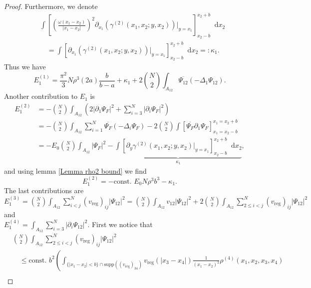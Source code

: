\documentclass[a4paper,11pt]{article}
\newcommand{\supp}{\text{supp}}
\newcommand{\abs}[1]{\left\lvert #1 \right\rvert}
\newcommand*\diff{\mathop{}\!\mathrm{d}}
\numberwithin{equation}{section}
\begin{document}
\begin{proof}
		Furthermore, we denote \begin{equation}\label{EqGammaDeriv2.}
		\begin{aligned}
		&\int\left[\left(\frac{\omega(x_1-x_2)}{\abs{x_1-x_2}}\right)^2\partial_{x_1}\left(\gamma^{(2)}(x_1,x_2;y,x_2)\right)\bigg\vert_{y=x_1}\right]_{x_2-b}^{x_2+b}\diff x_2\\
		&\quad=\int\left[\partial_{x_1}\left(\gamma^{(2)}(x_1,x_2;y,x_2)\right)\bigg\vert_{y=x_1}\right]_{x_2-b}^{x_2+b}\diff x_2=:\kappa_1.
		\end{aligned}
		\end{equation}
		Thus we have \begin{equation}
		E_1^{(1)}=\frac{\pi^2}{3}N\rho^3 (2a)\frac{b}{b-a}+\kappa_1+2\binom{N}{2}\int_{A_{12}}\overline{\Psi_{12}}(-\Delta_1\Psi_{12}).
		\end{equation}
		Another contribution to $ E_1 $ is \begin{equation}
		\begin{aligned}
		E_1^{(2)}&=-\binom{N}{2}\int_{A_{12}}\left(2\abs{\partial_1\Psi_F}^2+\sum_{i=3}^{N}\abs{\partial_i\Psi_F}^2\right)\\&=-\binom{N}{2}\int_{A_{12}}\sum_{i=1}^{N}\overline{\Psi_F}(-\Delta_i\Psi_F)-2\binom{N}{2}\int\left[\overline{\Psi_F}\partial_1\Psi_F\right]_{x_1=x_2-b}^{x_1=x_2+b}\\
		&=-E_0\binom{N}{2}\int_{A_{12}}\abs{\Psi_F}^2-\underbrace{\int\left[\partial_y\gamma^{(2)}(x_1,x_2;y,x_2)\vert_{y=x_1}\right]_{x_2-b}^{x_2+b} \diff x_2}_{\kappa_1},
		\end{aligned}
		\end{equation}
		and using lemma \ref{Lemma rho2 bound} we find \begin{equation}
		E_1^{(2)}=-\text{const. }E_0 N\rho^3b^3-\kappa_1.
		\end{equation}
		The last contributions are\\ $ E^{(3)}_1=\binom{N}{2}\int_{A_{12}} \sum_{i<j}^{N}(v_{\text{reg}})_{ij}\abs{\Psi_{12}}^2=\binom{N}{2}\int_{A_{12}}v_{12}\abs{\Psi_{12}}^2+2\binom{N}{2}\int_{A_{12}} \sum_{2\leq i<j}^{N}(v_{\text{reg}})_{ij}\abs{\Psi_{12}}^2 $ and\\ $ E_1^{(4)}=\int_{A_{12}}\sum_{i=3}^{N}\abs{\partial_i\Psi_{12}}^2 $.
		First we notice that \begin{equation}
		\begin{aligned}
		&\binom{N}{2}\int_{A_{12}} \sum_{2\leq i<j}^{N}(v_{\text{reg}})_{ij}\abs{\Psi_{12}}^2\\&\quad\leq \text{const. }b^2 \left(\int_{\{\abs{x_1-x_2}<b\}\cap\supp((v_{\text{reg}})_{34})}v_{\text{reg}}(\abs{x_3-x_4})\frac{1}{(x_1-x_2)^2}\rho^{(4)}(x_1,x_2,x_3,x_4)\right.\\

\end{aligned}
\end{equation}
\end{proof}
\end{document}
